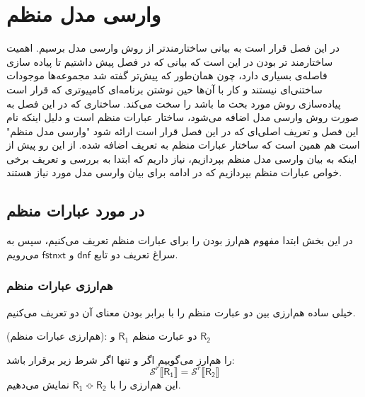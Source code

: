 \chapter{وارسی مدل منظم}
در این فصل قرار است به بیانی ساختارمندتر از روش وارسی مدل برسیم. اهمیت ساختارمند تر بودن در این است که بیانی که در فصل پیش داشتیم تا پیاده سازی فاصله‌ی بسیاری دارد، چون همان‌طور که پیش‌تر گفته شد مجموعه‌ها موجودات ساختنی‌ای نیستند و کار با آن‌ها حین نوشتن برنامه‌ای کامپیوتری‌ که قرار است پیاده‌سازی روش مورد بحث ما باشد را سخت می‌کند. ساختاری که در این فصل به صورت روش وارسی مدل اضافه می‌شود، ساختار عبارات منظم است و دلیل اینکه نام این فصل و تعریف اصلی‌ای که در این فصل قرار است ارائه شود "وارسی مدل منظم" است هم همین است که ساختار عبارات منظم به تعریف اضافه شده. از این رو پیش از اینکه به بیان وارسی مدل منظم بپردازیم، نیاز داریم که ابتدا به بررسی و تعریف برخی خواص عبارات منظم بپردازیم که در ادامه برای بیان وارسی مدل مورد نیاز هستند.

\section{در مورد عبارات منظم}
در این بخش ابتدا مفهوم هم‌ارز بودن را برای عبارات منظم تعریف می‌کنیم، سپس به سراغ تعریف دو تابع 
$\mathsf{dnf}$
و 
$\mathsf{fstnxt}$
می‌رویم. 
\subsection{هم‌ارزی عبارات منظم}
‌خیلی ساده هم‌ارزی بین دو عبارت منظم را با برابر بودن معنای آن دو تعریف می‌کنیم.
\begin{defn}
	(هم‌ارزی عبارات منظم):
	دو عبارت منظم
	$\mathsf{R}_1$
	و
	$\mathsf{R_2}$

	 را هم‌ارز می‌گوییم اگر و تنها اگر شرط زیر برقرار باشد:
	 $$\mathcal{S}^r \llbracket \mathsf{R_1} \rrbracket = \mathcal{S}^r \llbracket \mathsf{R_2} \rrbracket$$ 
	 این هم‌ارزی را با 
	 $\mathsf{R_1} \Bumpeq \mathsf{R_2}$
	 نمایش می‌دهیم.
\end{defn}

